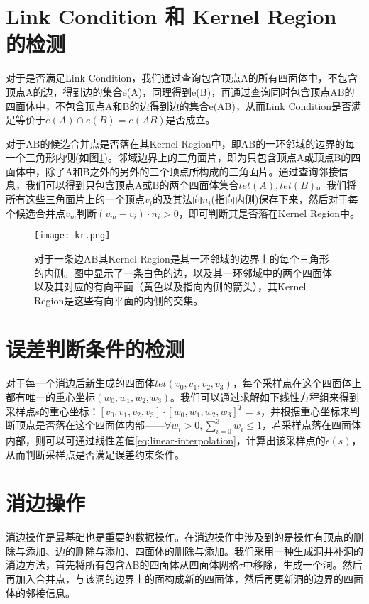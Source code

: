 \section{Link Condition 和 Kernel Region 的检测}
对于是否满足Link Condition，我们通过查询包含顶点A的所有四面体中，不包含顶点A的边，得到边的集合e(A)，同理得到e(B)，再通过查询同时包含顶点AB的四面体中，不包含顶点A和B的边得到边的集合e(AB)，从而Link Condition是否满足等价于$e(A) \cap e(B) = e(AB)$是否成立。 \par
对于AB的候选合并点是否落在其Kernel Region中，即AB的一环邻域的边界的每一个三角形内侧(如图\ref{fig:kr})。邻域边界上的三角面片，即为只包含顶点A或顶点B的四面体中，除了A和B之外的另外的三个顶点所构成的三角面片。通过查询邻接信息，我们可以得到只包含顶点A或B的两个四面体集合$tet(A),tet(B)$。我们将所有这些三角面片上的一个顶点$v_i$的及其法向$n_i$(指向内侧)保存下来，然后对于每个候选合并点$v_m$判断$(v_m − v_i) \cdot n_i > 0$，即可判断其是否落在Kernel Region中。
\begin{figure}[htbp]
    \centering
    \texttt{[image: kr.png]}
    \caption{对于一条边AB其Kernel Region是其一环邻域的边界上的每个三角形的内侧。图中显示了一条白色的边，以及其一环邻域中的两个四面体以及其对应的有向平面（黄色以及指向内侧的箭头），其Kernel Region是这些有向平面的内侧的交集。}
    \label{fig:kr}
\end{figure}

\section{误差判断条件的检测}
对于每一个消边后新生成的四面体$tet(v_0, v_1, v_2, v_3)$，每个采样点在这个四面体上都有唯一的重心坐标$(w_0, w_1, w_2, w_3)$。我们可以通过求解如下线性方程组来得到采样点s的重心坐标：$[v_0, v_1, v_2, v_3] \cdot [w_0, w_1, w_2, w_3]^T=s$，并根据重心坐标来判断顶点是否落在这个四面体内部——$\forall w_i>0, \sum_{i=0}^3 w_i \leq 1$，若采样点落在四面体内部，则可以可通过线性差值\eqref{eq:linear-interpolation}，计算出该采样点的$\epsilon(s)$，从而判断采样点是否满足误差约束条件。

\section{消边操作}
消边操作是最基础也是重要的数据操作。在消边操作中涉及到的是操作有顶点的删除与添加、边的删除与添加、四面体的删除与添加。我们采用一种生成洞并补洞的消边方法，首先将所有包含AB的四面体从四面体网格$\tau$中移除，生成一个洞。然后再加入合并点，与该洞的边界上的面构成新的四面体，然后再更新洞的边界的四面体的邻接信息。
